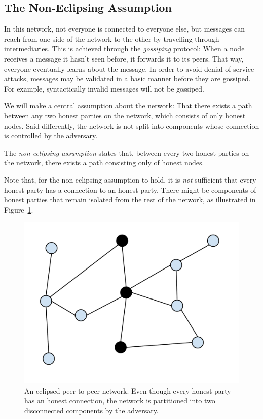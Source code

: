 \subsection*{The Non-Eclipsing Assumption}

In this network, not everyone is connected to everyone else, but messages can reach from
one side of the network to the other by travelling through intermediaries. This is achieved
through the \emph{gossiping} protocol: When a node receives a message it hasn't seen before,
it forwards it to its peers. That way, everyone eventually learns about the message. In order
to avoid denial-of-service attacks, messages may be validated in a basic manner before they
are gossiped. For example, syntactically invalid messages will not be gossiped.

We will make a central assumption about the network: That there exists a path between any two honest parties on the network, which consists of only honest nodes. Said differently, the network is not split into components whose connection is controlled by the adversary.

\begin{definition}
  The \emph{non-eclipsing assumption} states that,
  between every two honest parties on the network, there exists a path consisting only of honest nodes.
\end{definition}

Note that, for the non-eclipsing assumption to hold, it is \emph{not} sufficient that every honest party
has a connection to an honest party. There might be components of honest parties that remain
isolated from the rest of the network, as illustrated in Figure~\ref{fig.eclipsing}.

\begin{figure}[h]
    \centering
    \includegraphics[width=0.5 \columnwidth,keepaspectratio]{figures/eclipsed-peer-to-peer-network.pdf}
    \caption{An eclipsed peer-to-peer network. Even though every honest party has an honest connection,
    the network is partitioned into two disconnected components by the adversary.}
    \label{fig.eclipsing}
\end{figure}

